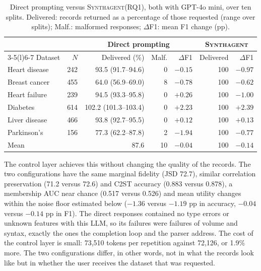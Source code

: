 \documentclass[conference]{IEEEtran}
\newcommand{\system}{\textsc{Synthagent}\xspace}
\begin{document}
\begin{table}[t]
\centering
\caption{Direct prompting versus \system (RQ1), both with GPT-4o mini, over ten splits. Delivered: records returned as a percentage of those requested (range over splits); Malf.: malformed responses; $\Delta$F1: mean F1 change (pp).}
\label{tab:raw}
\scriptsize
\setlength{\tabcolsep}{2pt}
\begin{tabular*}{\columnwidth}{@{\extracolsep{\fill}}lrrrrrr@{}}
\toprule
& & \multicolumn{3}{c}{Direct prompting} & \multicolumn{2}{c}{\system} \\
\cmidrule(lr){3-5}\cmidrule(l){6-7}
Dataset & $N$ & Delivered (\%) & Malf. & $\Delta$F1 & Delivered & $\Delta$F1 \\
\midrule
Heart disease & 242 & 93.5 (91.7--94.6) & 0 & $-0.15$ & 100 & $-0.97$ \\
Breast cancer & 455 & 64.0 (56.9--69.0) & 8 & $-0.78$ & 100 & $-0.62$ \\
Heart failure & 239 & 94.5 (93.3--95.8) & 0 & $+0.26$ & 100 & $-1.00$ \\
Diabetes & 614 & 102.2 (101.3--103.4) & 0 & $+2.23$ & 100 & $+2.39$ \\
Liver disease & 466 & 93.8 (92.7--95.5) & 0 & $+0.12$ & 100 & $+0.13$ \\
Parkinson's & 156 & 77.3 (62.2--87.8) & 2 & $-1.94$ & 100 & $-0.77$ \\
\midrule
Mean & & 87.6 & 10 & $-0.04$ & 100 & $-0.14$ \\
\bottomrule
\end{tabular*}
\end{table}

The control layer achieves this without changing the quality of the records. The two configurations have the same marginal fidelity (JSD 72.7), similar correlation preservation (71.2 versus 72.6) and C2ST accuracy (0.883 versus 0.878), a membership AUC near chance (0.517 versus 0.526) and mean utility changes within the noise floor estimated below ($-1.36$ versus $-1.19$ pp in accuracy, $-0.04$ versus $-0.14$ pp in F1). The direct responses contained no type errors or unknown features with this LLM, so its failures were failures of volume and syntax, exactly the ones the completion loop and the parser address. The cost of the control layer is small: 73,510 tokens per repetition against 72,126, or 1.9\% more. The two configurations differ, in other words, not in what the records look like but in whether the user receives the dataset that was requested.
\end{document}
